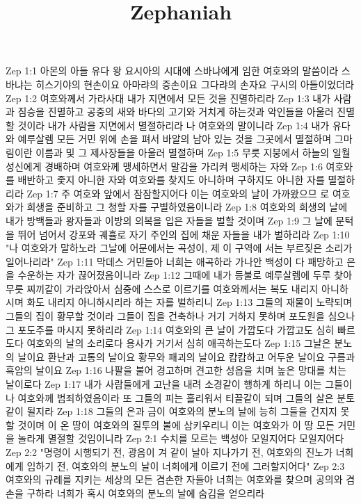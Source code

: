 

\title{Zephaniah}

Zep 1:1  아몬의 아들 유다 왕 요시아의 시대에 스바냐에게 임한 여호와의 말씀이라 스바냐는 히스기야의 현손이요 아마랴의 증손이요 그다랴의 손자요 구시의 아들이었더라
Zep 1:2  여호와께서 가라사대 내가 지면에서 모든 것을 진멸하리라
Zep 1:3  내가 사람과 짐승을 진멸하고 공중의 새와 바다의 고기와 거치게 하는것과 악인들을 아울러 진멸할 것이라 내가 사람을 지면에서 멸절하리라 나 여호와의 말이니라
Zep 1:4  내가 유다와 예루살렘 모든 거민 위에 손을 펴서 바알의 남아 있는 것을 그곳에서 멸절하며 그마림이란 이름과 및 그 제사장들을 아울러 멸절하며
Zep 1:5  무릇 지붕에서 하늘의 일월성신에게 경배하며 여호와께 맹세하면서 말감을 가리켜 맹세하는 자와
Zep 1:6  여호와를 배반하고 좇지 아니한 자와 여호와를 찾지도 아니하며 구하지도 아니한 자를 멸절하리라
Zep 1:7  주 여호와 앞에서 잠잠할지어다 이는 여호와의 날이 가까왔으므 로 여호와가 희생을 준비하고 그 청할 자를 구별하였음이니라
Zep 1:8  여호와의 희생의 날에 내가 방백들과 왕자들과 이방의 의복을 입은 자들을 벌할 것이며
Zep 1:9  그 날에 문턱을 뛰어 넘어서 강포와 궤휼로 자기 주인의 집에 채운 자들을 내가 벌하리라
Zep 1:10  "나 여호와가 말하노라 그날에 어문에서는 곡성이, 제 이 구역에 서는 부르짖은 소리가 일어나리라"
Zep 1:11  막데스 거민들아 너희는 애곡하라 가나안 백성이 다 패망하고 은을 수운하는 자가 끊어졌음이니라
Zep 1:12  그때에 내가 등불로 예루살렘에 두루 찾아 무릇 찌끼같이 가라앉아서 심중에 스스로 이르기를 여호와께서는 복도 내리지 아니하시며 화도 내리지 아니하시리라 하는 자를 벌하리니
Zep 1:13  그들의 재물이 노략되며 그들의 집이 황무할 것이라 그들이 집을 건축하나 거기 거하지 못하며 포도원을 심으나 그 포도주를 마시지 못하리라
Zep 1:14  여호와의 큰 날이 가깝도다 가깝고도 심히 빠르도다 여호와의 날의 소리로다 용사가 거기서 심히 애곡하는도다
Zep 1:15  그날은 분노의 날이요 환난과 고통의 날이요 황무와 패괴의 날이요 캄캄하고 어두운 날이요 구름과 흑암의 날이요
Zep 1:16  나팔을 불어 경고하며 견고한 성읍을 치며 높은 망대를 치는 날이로다
Zep 1:17  내가 사람들에게 고난을 내려 소경같이 행하게 하리니 이는 그들이 나 여호와께 범죄하였음이라 또 그들의 피는 흘리워서 티끌같이 되며 그들의 살은 분토같이 될지라
Zep 1:18  그들의 은과 금이 여호와의 분노의 날에 능히 그들을 건지지 못 할 것이며 이 온 땅이 여호와의 질투의 불에 삼키우리니 이는 여호와가 이 땅 모든 거민을 놀라게 멸절할 것임이니라
Zep 2:1  수치를 모르는 백성아 모일지어다 모일지어다
Zep 2:2  "명령이 시행되기 전, 광음이 겨 같이 날아 지나가기 전, 여호와의 진노가 너희에게 임하기 전, 여호와의 분노의 날이 너희에게 이르기 전에 그러할지어다"
Zep 2:3  여호와의 규례를 지키는 세상의 모든 겸손한 자들아 너희는 여호와를 찾으며 공의와 겸손을 구하라 너희가 혹시 여호와의 분노의 날에 숨김을 얻으리라
